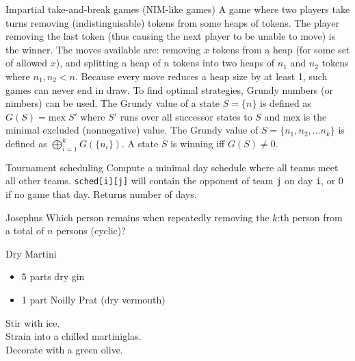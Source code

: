 \clearpage
{}
\categorycontents{}




\begin{algorithm}{Impartial take-and-break games (NIM-like games)}
\desc
A game where two players take turns removing (indistinguisable) tokens
from some heaps of tokens.  The player removing the last token (thus
causing the next player to be unable to move) is the winner.  The
moves available are: removing $x$ tokens from a heap (for some set of
allowed $x$), and splitting a heap of $n$ tokens into two heaps of
$n_1$ and $n_2$ tokens where $n_1, n_2 < n$.  Because every move
reduces a heap size by at least 1, such games can never end in draw.
To find optimal strategies, Grundy numbers (or nimbers) can be used.
The Grundy value of a state $S = \{n\}$ is defined as $G(S) =
\mathrm{mex}\;S'$ where $S'$ runs over all successor states to $S$ and
$\mathrm{mex}$ is the minimal excluded (nonnegative) value.  The
Grundy value of $S =
\{n_1, n_2, \ldots n_k\}$ is defined as $\bigoplus_{i=1}^{k}
G(\{n_i\})$.  A state $S$ is winning iff $G(S) \ne 0$.

\end{algorithm}




\begin{algorithm}{Tournament scheduling}
\desc
Compute a minimal day schedule where all teams meet all other
teams. {\tt sched[i][j]} will contain the opponent of team {\tt j} on
day {\tt i}, or 0 if no game that day.  Returns number of days.
\end{algorithm}

\begin{algorithm}{Josephus}
\desc
Which person remains when repeatedly removing the $k$:th person from a
total of $n$ persons (cyclic)?
\end{algorithm}







\begin{algorithm}{Dry Martini}
\desc
\begin{itemize}
\item 5 parts dry gin
\item 1 part Noilly Prat (dry vermouth)
\end{itemize}
Stir with ice.\\
Strain into a chilled martiniglas.\\
Decorate with a green olive.
\end{algorithm}



